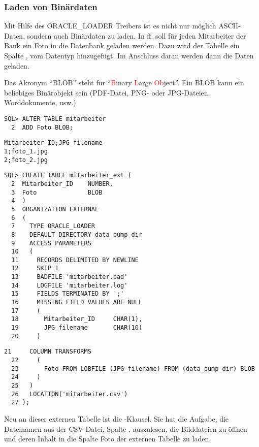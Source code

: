         \subsubsection{Laden von Binärdaten}
          Mit Hilfe des ORACLE\_LOADER Treibers ist es nicht nur möglich ASCII-Daten, sondern auch Binärdaten zu laden. In  ff. soll für jeden Mitarbeiter der Bank ein Foto in die Datenbank geladen werden. Dazu wird der Tabelle  ein Spalte , vom Datentyp  hinzugefügt. Im Anschluss daran werden dann die Daten geladen.
          \begin{merke}
            Das Akronym \enquote{BLOB} steht für \enquote{\textcolor{red}{B}inary \textcolor{red}{L}arge \textcolor{red}{Ob}ject}. Ein BLOB kann ein beliebiges Binärobjekt sein (PDF-Datei, PNG- oder JPG-Dateien, Worddokumente, usw.)
          \end{merke}

          \begin{lstlisting}[caption={Anfügen einer BLOB-Spalte},label=admin930,language=oracle_sql]
SQL> ALTER TABLE mitarbeiter
  2  ADD Foto BLOB;

          \end{lstlisting}
          \begin{lstlisting}[caption={Die Datei mitarbeiter.csv},label=admin931,language=terminal]
Mitarbeiter_ID;JPG_filename
1;foto_1.jpg
2;foto_2.jpg
          \end{lstlisting}
          \begin{lstlisting}[caption={Erstellen der externen Tabelle \identifier{mitarbeiter\_ext}}, label=admin932, language=oracle_sql]
SQL> CREATE TABLE mitarbeiter_ext (
  2  Mitarbeiter_ID    NUMBER,
  3  Foto              BLOB
  4  )
  5  ORGANIZATION EXTERNAL
  6  (
  7    TYPE ORACLE_LOADER
  8    DEFAULT DIRECTORY data_pump_dir
  9    ACCESS PARAMETERS
  10   (
  11     RECORDS DELIMITED BY NEWLINE
  12     SKIP 1
  13     BADFILE 'mitarbeiter.bad'
  14     LOGFILE 'mitarbeiter.log'
  15     FIELDS TERMINATED BY ';'
  16     MISSING FIELD VALUES ARE NULL
  17     (
  18       Mitarbeiter_ID     CHAR(1),
  19       JPG_filename       CHAR(10)
  20     )
          \end{lstlisting}
\clearpage
          \begin{lstlisting}[caption={Erstellen der externen Tabelle \identifier{mitarbeiter\_ext} - Fortsetzung}, language=oracle_sql]
  21     COLUMN TRANSFORMS
  22     (
  23       Foto FROM LOBFILE (JPG_filename) FROM (data_pump_dir) BLOB
  24     )
  25   )
  26   LOCATION('mitarbeiter.csv')
  27 );
          \end{lstlisting}
          Neu an dieser externen Tabelle ist die -Klausel. Sie hat die Aufgabe, die Dateinamen aus der CSV-Datei, Spalte , auszulesen, die Bilddateien zu öffnen und deren Inhalt in die Spalte Foto der externen Tabelle zu laden.
